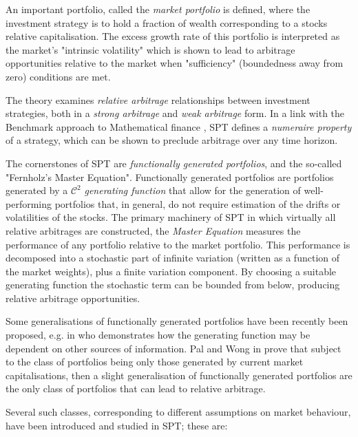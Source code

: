\documentclass[british]{amsart} \usepackage{lmodern}
\numberwithin{equation}{section} \numberwithin{figure}{section}
\theoremstyle{plain} \newtheorem{thm}{\protect\theoremname}[section]
\theoremstyle{definition} \newtheorem{defn}[thm]{\protect\definitionname}
\theoremstyle{plain} \newtheorem{assumption}[thm]{\protect\assumptionname}
\theoremstyle{plain} \newtheorem{lem}[thm]{\protect\lemmaname}
\theoremstyle{plain} \newtheorem{prop}[thm]{\protect\propositionname}
\theoremstyle{remark} \newtheorem{rem}[thm]{\protect\remarkname}
\theoremstyle{plain} \newtheorem{cor}[thm]{\protect\corollaryname}
\begin{document}
An important portfolio, called the \textit{market portfolio} is defined, where the
investment strategy is to hold a fraction of wealth corresponding to a stocks
relative capitalisation. The excess growth rate of this portfolio is interpreted
as the market's "intrinsic volatility" which is shown to lead to arbitrage
opportunities relative to the market when "sufficiency" (boundedness away from
zero) conditions are met.

The theory examines \textit{relative arbitrage} relationships between investment
strategies, both in a \textit{strong arbitrage} and \textit{weak arbitrage}
form. In a link with the Benchmark approach to Mathematical finance
\cite{platen2006}, SPT defines a \textit{numeraire property} of a strategy,
which can be shown to preclude arbitrage over any time horizon.

The cornerstones of SPT are \textit{functionally generated portfolios}, and
the so-called "Fernholz's Master Equation". Functionally generated portfolios are
portfolios generated by a $\mathcal{C}^2$ \textit{generating function} that allow
for the generation of well-performing portfolios that, in general, do not require
estimation of the drifts or volatilities of the stocks. The primary machinery of
SPT in which virtually all relative arbitrages are constructed, the
\textit{Master Equation} measures the performance of any portfolio relative to
the market portfolio. This performance is decomposed into a stochastic part of
infinite variation (written as a function of the market weights), plus a
finite variation component. By choosing a suitable generating function the
stochastic term can be bounded from below, producing relative arbitrage
opportunities.

Some generalisations of functionally generated portfolios have been recently
been proposed, e.g. in \cite{strong2014generalizations} who demonstrates how the
generating function may be dependent on other sources of information. Pal and
Wong in \cite{pal2013} prove that subject to the class of portfolios being only
those generated by current market capitalisations, then a slight generalisation
of functionally generated portfolios are the only class of portfolios that can
lead to relative arbitrage.

Several such classes, corresponding to different assumptions on market
behaviour, have been introduced and studied in SPT; these are:
\end{document}
